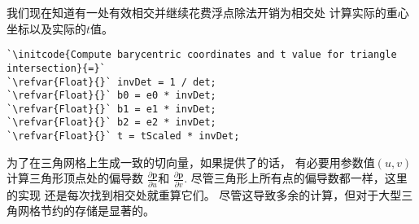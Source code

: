 我们现在知道有一处有效相交并继续花费浮点除法开销为相交处
计算实际的重心坐标以及实际的$t$值。
\begin{lstlisting}
`\initcode{Compute barycentric coordinates and t value for triangle intersection}{=}`
`\refvar{Float}{}` invDet = 1 / det;
`\refvar{Float}{}` b0 = e0 * invDet;
`\refvar{Float}{}` b1 = e1 * invDet;
`\refvar{Float}{}` b2 = e2 * invDet;
`\refvar{Float}{}` t = tScaled * invDet;
\end{lstlisting}

为了在三角网格上生成一致的切向量，如果提供了的话，
有必要用参数值$(u,v)$计算三角形顶点处的偏导数
$\displaystyle\frac{\partial \bm p}{\partial u}$和
$\displaystyle\frac{\partial \bm p}{\partial v}$.
尽管三角形上所有点的偏导数都一样，这里的实现
还是每次找到相交处就重算它们。
尽管这导致多余的计算，但对于大型三角网格节约的存储是显著的。

